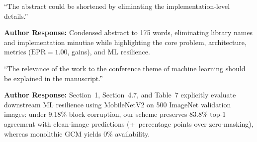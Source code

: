 \documentclass[11pt,a4paper]{article}
\begin{document}
\begin{tcolorbox}[title=Comment 3.1 (Shorten Abstract, Eliminate Implementation Details)]
``The abstract could be shortened by eliminating the implementation-level details.''
\end{tcolorbox}
\textbf{Author Response:} Condensed abstract to 175 words, eliminating library names and implementation minutiae while highlighting the core problem, architecture, metrics ($\text{EPR} = 1.00$, gains), and ML resilience.

\begin{tcolorbox}[title=Comment 3.2 (Explain Relevance to Machine Learning Theme)]
``The relevance of the work to the conference theme of machine learning should be explained in the manuscript.''
\end{tcolorbox}
\textbf{Author Response:} Section~1, Section~4.7, and Table~7 explicitly evaluate downstream ML resilience using MobileNetV2 on 500 ImageNet validation images: under 9.18\% block corruption, our scheme preserves 83.8\% top-1 agreement with clean-image predictions (+\mlGainKEighteenRaw\ percentage points over zero-masking), whereas monolithic GCM yields 0\% availability.
\end{document}
